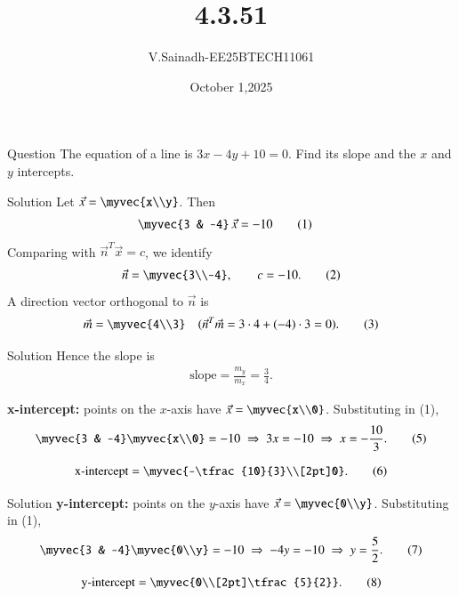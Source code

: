 \documentclass{beamer}
\begin{document}
\title 
{4.3.51}
\date{October 1,2025}
\author 
{V.Sainadh-EE25BTECH11061}
\frame{\titlepage}
\begin{frame}{Question}
The equation of a line is $3x-4y+10=0$. Find its slope and the $x$ and $y$ intercepts. \\[6pt]
\end{frame}
\begin{frame}{Solution}
Let $\vec{x}=\myvec{x\\y}$. Then
\begin{align}
\myvec{3 & -4}\,\vec{x} &= -10 \tag{1}
\end{align}
Comparing with $\vec{n}^{T}\vec{x}=c$, we identify
\begin{align}
\vec{n}=\myvec{3\\-4}, \qquad c=-10. \tag{2}
\end{align}
A direction vector orthogonal to $\vec{n}$ is
\begin{align}
\vec{m}=\myvec{4\\3} \quad (\vec{n}^{T}\vec{m}=3\cdot4+(-4)\cdot3=0). \tag{3}
\end{align}
  \end{frame}
  \begin{frame}{Solution}
  Hence the slope is
\begin{align}
\text{slope}=\frac{m_y}{m_x}=\frac{3}{4}. \tag{4}
\end{align}

\textbf{x-intercept:} points on the $x$-axis have $\vec{x}=\myvec{x\\0}$. Substituting in (1),
\begin{align}
\myvec{3 & -4}\myvec{x\\0}=-10 \;\Rightarrow\; 3x=-10 \;\Rightarrow\; x=-\frac{10}{3}. \tag{5}
\end{align}

\begin{align}
\text{x-intercept}=\myvec{-\tfrac{10}{3}\\[2pt]0}. \tag{6}
\end{align}
\end{frame}

\begin{frame}{Solution}
\textbf{y-intercept:} points on the $y$-axis have $\vec{x}=\myvec{0\\y}$. Substituting in (1),
\begin{align}
\myvec{3 & -4}\myvec{0\\y}=-10 \;\Rightarrow\; -4y=-10 \;\Rightarrow\; y=\frac{5}{2}. \tag{7}
\end{align}

\begin{align}
\text{y-intercept}=\myvec{0\\[2pt]\tfrac{5}{2}}. \tag{8}
\end{align}
\end{frame}
\end{document}
